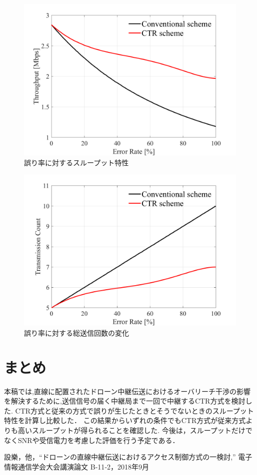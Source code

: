 \documentclass[a4paper,10pt]{ltjsarticle}
\begin{document}
\begin{figure}[H]
  \centering
  \includegraphics[width=\linewidth]{throughput_probabilistic_retry_v3.pdf} %
  \caption{誤り率に対するスループット特性}
  \label{fig:throughput_v3} %
\end{figure}
\begin{figure}[H]
  \centering
  \includegraphics[width=\linewidth]{throughput_probabilistic_retry_v3.1.pdf} %
  \caption{誤り率に対する総送信回数の変化}
  \label{fig:throughput_v3.1} %
\end{figure}

\section{まとめ}
本稿では,直線に配置されたドローン中継伝送におけるオーバリーチ干渉の影響を解決するために,送信信号の届く中継局まで一回で中継するCTR方式を検討した.
CTR方式と従来の方式で誤りが生じたときとそうでないときのスループット特性を計算し比較した．
この結果からいずれの条件でもCTR方式が従来方式よりも高いスループットが得られることを確認した.
今後は，スループットだけでなくSNRや受信電力を考慮した評価を行う予定である．
\begin{thebibliography}{99}
  設樂，他，“ドローンの直線中継伝送におけるアクセス制御方式の一検討,” 電子情報通信学会大会講演論文 B‐11‐2，2018年9月
\end{thebibliography}

%
\end{document}
